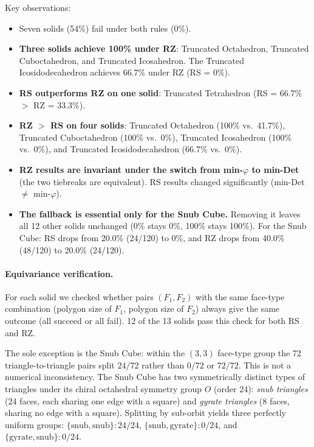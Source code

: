 \documentclass[12pt,a4paper]{article}
\theoremstyle{definition}
\begin{document}
\noindent
Key observations:
\begin{itemize}
  \item Seven solids (54\%) fail under both rules (0\%).
  \item \textbf{Three solids achieve 100\% under RZ}:
        Truncated Octahedron, Truncated Cuboctahedron, and
        Truncated Icosahedron.
        The Truncated Icosidodecahedron achieves 66.7\% under RZ
        (RS = 0\%).
  \item \textbf{RS outperforms RZ on one solid}:
        Truncated Tetrahedron (RS = 66.7\% $>$ RZ = 33.3\%).
  \item \textbf{RZ $>$ RS on four solids}:
        Truncated Octahedron (100\% vs.\ 41.7\%),
        Truncated Cuboctahedron (100\% vs.\ 0\%),
        Truncated Icosahedron (100\% vs.\ 0\%), and
        Truncated Icosidodecahedron (66.7\% vs.\ 0\%).
  \item \textbf{RZ results are invariant under the switch from
        min-$\varphi$ to min-Det} (the two tiebreaks are equivalent).
        RS results changed significantly (min-Det $\ne$ min-$\varphi$).
  \item \textbf{The fallback is essential only for the Snub Cube.}
        Removing it leaves all 12 other solids unchanged (0\% stays 0\%,
        100\% stays 100\%).
        For the Snub Cube: RS drops from 20.0\% (24/120) to 0\%,
        and RZ drops from 40.0\% (48/120) to 20.0\% (24/120).
\end{itemize}

\paragraph{Equivariance verification.}
For each solid we checked whether pairs $(F_1, F_2)$ with the same face-type
combination (polygon size of $F_1$, polygon size of $F_2$) always give the
same outcome (all succeed or all fail).
12 of the 13 solids pass this check for both RS and RZ.

The sole exception is the Snub Cube: within the $(3,3)$ face-type group
the 72 triangle-to-triangle pairs split $24/72$ rather than $0/72$ or $72/72$.
This is not a numerical inconsistency.
The Snub Cube has two symmetrically distinct types of triangles under its
chiral octahedral symmetry group $O$ (order 24):
\emph{snub triangles} (24 faces, each sharing one edge with a square)
and \emph{gyrate triangles} (8 faces, sharing no edge with a square).
Splitting by sub-orbit yields three perfectly uniform groups:
$\{\text{snub},\text{snub}\}: 24/24$,
$\{\text{snub},\text{gyrate}\}: 0/24$, and
$\{\text{gyrate},\text{snub}\}: 0/24$.
\end{document}
